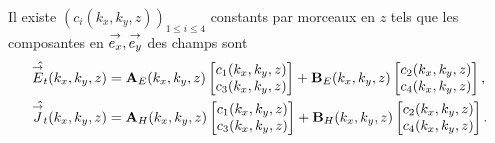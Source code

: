       \begin{prop}
          Il existe \((c_i(k_x,k_y,z))_{1\le i \le4}\) constants par morceaux en \(z\) tels que les composantes en \({\overset{\rightarrow}{e_x}},{\overset{\rightarrow}{e_y}}\) des champs sont
          \begin{align*}
              \hat{{\overset{\rightarrow}{E}}_t}(k_x,k_y,z) &= \mathbf{A}_E(k_x,k_y,z) \begin{bmatrix}c_1(k_x,k_y,z) \\ c_3(k_x,k_y,z)\end{bmatrix} + \mathbf{B}_E(k_x,k_y,z) \begin{bmatrix}c_2(k_x,k_y,z) \\ c_4(k_x,k_y,z)\end{bmatrix},
              \\
             \hat{{\overset{\rightarrow}{J}}_t}(k_x,k_y,z) &= \mathbf{A}_H(k_x,k_y,z) \begin{bmatrix}c_1(k_x,k_y,z) \\ c_3(k_x,k_y,z)\end{bmatrix} + \mathbf{B}_H(k_x,k_y,z) \begin{bmatrix}c_2(k_x,k_y,z) \\ c_4(k_x,k_y,z)\end{bmatrix}.
          \end{align*}
      \end{prop}

